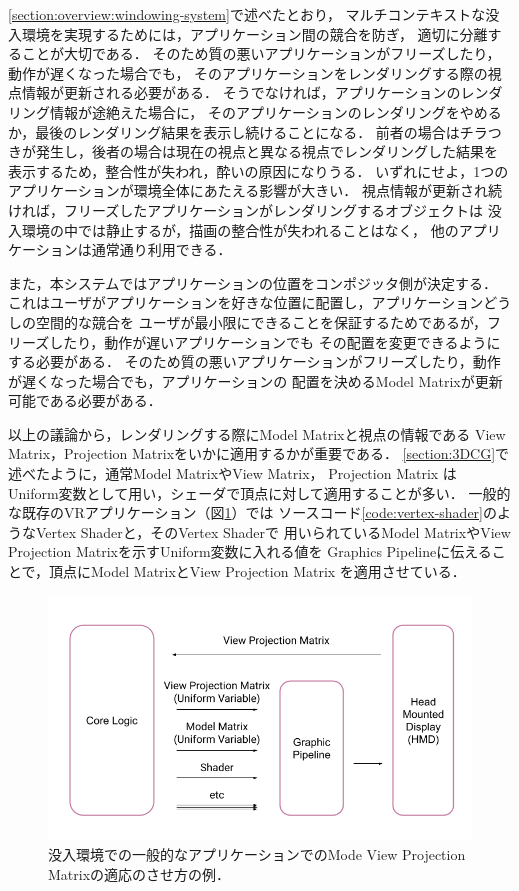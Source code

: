 \ref{section:overview:windowing-system}で述べたとおり，
マルチコンテキストな没入環境を実現するためには，アプリケーション間の競合を防ぎ，
適切に分離することが大切である．
そのため質の悪いアプリケーションがフリーズしたり，動作が遅くなった場合でも，
そのアプリケーションをレンダリングする際の視点情報が更新される必要がある．
そうでなければ，アプリケーションのレンダリング情報が途絶えた場合に，
そのアプリケーションのレンダリングをやめるか，最後のレンダリング結果を表示し続けることになる．
前者の場合はチラつきが発生し，後者の場合は現在の視点と異なる視点でレンダリングした結果を
表示するため，整合性が失われ，酔いの原因になりうる．
いずれにせよ，1つのアプリケーションが環境全体にあたえる影響が大きい．
視点情報が更新され続ければ，フリーズしたアプリケーションがレンダリングするオブジェクトは
没入環境の中では静止するが，描画の整合性が失われることはなく，
他のアプリケーションは通常通り利用できる．

また，本システムではアプリケーションの位置をコンポジッタ側が決定する．
これはユーザがアプリケーションを好きな位置に配置し，アプリケーションどうしの空間的な競合を
ユーザが最小限にできることを保証するためであるが，フリーズしたり，動作が遅いアプリケーションでも
その配置を変更できるようにする必要がある．
そのため質の悪いアプリケーションがフリーズしたり，動作が遅くなった場合でも，アプリケーションの
配置を決めるModel Matrixが更新可能である必要がある．

以上の議論から，レンダリングする際にModel Matrixと視点の情報である
View Matrix，Projection Matrixをいかに適用するかが重要である．
\ref{section:3DCG}で述べたように，通常Model MatrixやView Matrix， Projection Matrix は
Uniform変数として用い，シェーダで頂点に対して適用することが多い．
一般的な既存のVRアプリケーション（図\ref{fig:app-mvp}）では
ソースコード\ref{code:vertex-shader}のようなVertex Shaderと，そのVertex Shaderで
用いられているModel MatrixやView Projection Matrixを示すUniform変数に入れる値を
Graphics Pipelineに伝えることで，頂点にModel MatrixとView Projection Matrix
を適用させている．

\begin{figure}[htbp]
  \centering
  \includegraphics[keepaspectratio, width=1\linewidth]{figures/app-mvp.png}
  \caption{
    没入環境での一般的なアプリケーションでのMode View Projection Matrixの適応のさせ方の例．
  }
  \label{fig:app-mvp}
\end{figure}


